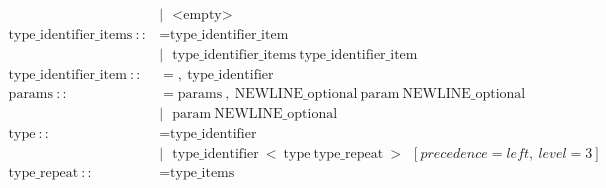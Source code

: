 \documentclass[a4paper,12pt]{book} %
\begin{document}
\begin{align*}
                                      & |\ \ \ \text{<empty>}                                                                                                                                                                                                     \\
  \text{type\_identifier\_items}\ ::  & = \text{type\_identifier\_item}                                                                                                                                                                                           \\
                                      & |\ \ \ \text{type\_identifier\_items}\ \text{type\_identifier\_item}                                                                                                                                                      \\
  \text{type\_identifier\_item}\ ::   & = ,\ \text{type\_identifier}                                                                                                                                                                                              \\
  \text{params}\ ::                   & = \text{params}\ ,\ \text{NEWLINE\_optional}\ \text{param}\ \text{NEWLINE\_optional}                                                                                                                                      \\
                                      & |\ \ \ \text{param}\ \text{NEWLINE\_optional}                                                                                                                                                                             \\
  \text{type}\ ::                     & = \text{type\_identifier}                                                                                                                                                                                                 \\
                                      & |\ \ \ \text{type\_identifier}\ <\ \text{type}\ \text{type\_repeat}\ >\ \ [precedence=left,\ level=3]                                                                                                                     \\
  \text{type\_repeat}\ ::             & = \text{type\_items}                                                                                                                                                                                                      \\

\end{align*}
\end{document}
